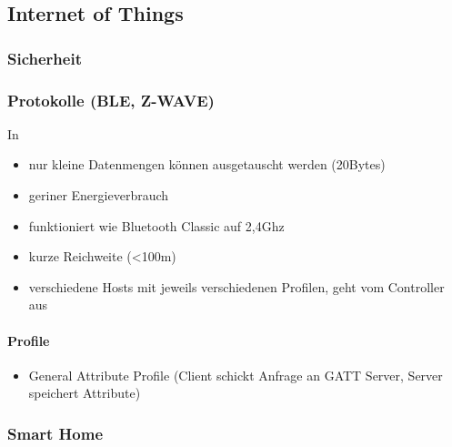 \subsection{Internet of Things}
\label{sec:sota_iot}
\subsubsection{Sicherheit}
\label{sec:sota_iot_security}
\subsubsection{Protokolle (BLE, Z-WAVE)}
    \cite{Gomez2012}
    In \cite{Rose2016}
    \begin{itemize}
        \item nur kleine Datenmengen können ausgetauscht werden (20Bytes)\cite{Rose2016}
        \item geriner Energieverbrauch
        \item funktioniert wie Bluetooth Classic auf 2,4Ghz
        \item kurze Reichweite (<100m)
        \item verschiedene Hosts mit jeweils verschiedenen Profilen, geht vom Controller aus
    \end{itemize}
    
    \paragraph{Profile}\cite{Rose2016}
        \begin{itemize}
            \item General Attribute Profile (Client schickt Anfrage an GATT Server, Server speichert Attribute)
        \end{itemize}

\label{sec:sota_iot_protocols}
\subsubsection{Smart Home}
\label{sec:sota_iot_smart_home}